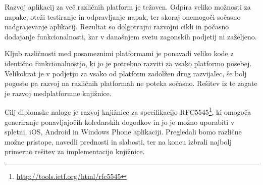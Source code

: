 








\begin{Povzetek}

Razvoj aplikacij za več različnih platform je težaven. Odpira veliko možnosti za napake, oteži testiranje in odpravljanje napak, ter skoraj onemogoči sočasno nadgrajevanje aplikacij. Rezultat so dolgotrajni razvojni cikli in počasno dodajanje funkcionalnosti, kar v današnjem svetu zagonskih podjetij ni zaželjeno.

Kljub različnosti med posameznimi platformami je ponavadi veliko kode z identično funkcionalnostjo, ki jo je potrebno razviti za vsako platformo posebej. Velikokrat je v podjetju za vsako od platform zadolžen drug razvijalec, še bolj pogosto pa razvoj na različnih platformah ne poteka sočasno. Rešitev iz te zagate je razvoj medplatformne knjižnice.

Cilj diplomske naloge je razvoj knjižnice za specifikacijo RFC5545\footnote{\href{http://tools.ietf.org/html/rfc5545}{http://tools.ietf.org/html/rfc5545}}, ki omogoča generiranje ponavljajočih koledarskih dogodkov in jo je možno uporabiti v spletni, iOS, Android in Windows Phone aplikaciji. Pregledali bomo različne možne pristope, navedli prednosti in slabosti, ter na koncu izbrali najbolj primerno rešitev za implementacijo knjižnice.
\end{Povzetek}









